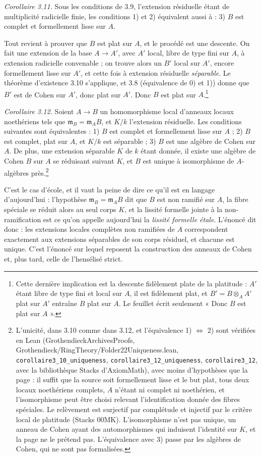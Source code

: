 \documentclass[11pt,a4paper]{article}
\begin{document}
\emph{Corollaire 3.11.} Sous les conditions de 3.9, l'extension résiduelle
étant de multiplicité radicielle finie, les conditions 1) et 2) équivalent
aussi à : 3) $B$ est complet et formellement lisse sur $A$.

Tout revient à prouver que $B$ est plat sur $A$, et le procédé est une descente.
On fait une extension de la base $A \to A'$, avec $A'$ local, libre de type fini
sur $A$, à extension radicielle convenable ; on trouve alors un $B'$ local sur
$A'$, encore formellement lisse sur $A'$, et cette fois à extension résiduelle
\emph{séparable}. Le théorème d'existence 3.10 s'applique, et 3.8 (équivalence
de 0) et 1)) donne que $B'$ est de Cohen sur $A'$, donc plat sur $A'$. Donc $B$
est plat sur $A$.\footnote{Cette dernière implication est la descente fidèlement
plate de la platitude : $A'$ étant libre de type fini et local sur $A$, il est
fidèlement plat, et $B' = B \otimes_A A'$ plat sur $A'$ entraîne $B$ plat sur
$A$. Le feuillet écrit seulement « Donc $B$ est plat sur $A$ ».}

\emph{Corollaire 3.12.} Soient $A \to B$ un homomorphisme local d'anneaux
locaux noethériens tels que $\mathfrak{m}_B = \mathfrak{m}_A B$, et $K/k$
l'extension résiduelle. Les conditions suivantes sont équivalentes : 1) $B$ est
complet et formellement lisse sur $A$ ; 2) $B$ est complet, plat sur $A$, et
$K/k$ est séparable ; 3) $B$ est une algèbre de Cohen sur $A$. De plus, une
extension séparable $K$ de $k$ étant donnée, il existe une algèbre de Cohen $B$
sur $A$ se réduisant suivant $K$, et $B$ est unique à isomorphisme de
$A$-algèbres près.\footnote{L'unicité, dans 3.10 comme dans 3.12, et
l'équivalence 1) $\Leftrightarrow$ 2) sont vérifiées en Lean
(GrothendieckArchivesProofs, Grothendieck/RingTheory/Folder22Uniqueness.lean,
\texttt{corollaire3\_10\_uniqueness}, \texttt{corollaire3\_12\_uniqueness},
\texttt{corollaire3\_12}, avec la bibliothèque Stacks d'AxiomMath), avec moins
d'hypothèses que la page : il suffit que la source soit formellement lisse et le
but plat, tous deux locaux noethériens complets, $A$ n'étant ni complet ni
noethérien, et l'isomorphisme peut être choisi relevant l'identification donnée des
fibres spéciales. Le relèvement est surjectif par complétude et injectif par le
critère local de platitude (Stacks 00MK). L'isomorphisme n'est pas unique, un
anneau de Cohen ayant des automorphismes qui induisent l'identité sur $K$, et la
page ne le prétend pas. L'équivalence avec 3) passe par les algèbres de Cohen, qui
ne sont pas formalisées.}

C'est le cas d'école, et il vaut la peine de dire ce qu'il est en langage
d'aujourd'hui : l'hypothèse $\mathfrak{m}_B = \mathfrak{m}_A B$ dit que $B$ est
non ramifié sur $A$, la fibre spéciale se réduit alors au seul corps $K$, et la
lissité formelle jointe à la non-ramification est ce qu'on appelle aujourd'hui
la \emph{lissité formelle étale}. L'énoncé dit donc : les extensions locales
complètes non ramifiées de $A$ correspondent exactement aux extensions
séparables de son corps résiduel, et chacune est unique. C'est l'énoncé sur
lequel reposent la construction des anneaux de Cohen et, plus tard, celle de
l'hensélisé strict.
\end{document}
